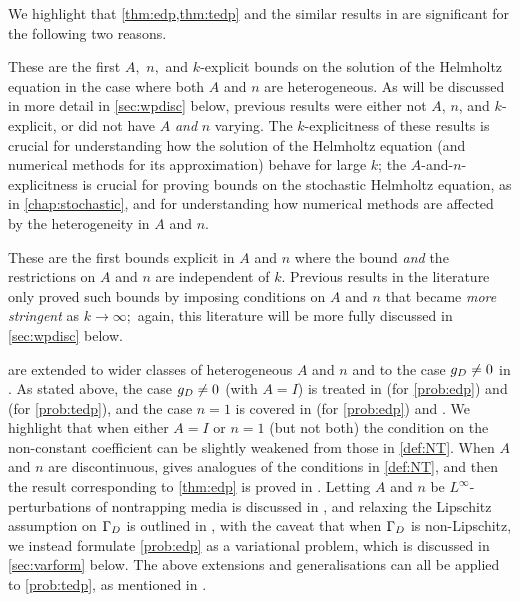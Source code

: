 We highlight that \cref{thm:edp,thm:tedp} and the similar results in \cite{GrPeSp:19} are significant for the following two reasons.
\ben
\item These are the first $A,$ $n,$ and $k$-explicit bounds on the solution of the Helmholtz equation in the case where both $A$ and $n$ are heterogeneous. As will be discussed in more detail in \cref{sec:wpdisc} below, previous results were either not $A$, $n$, and $k$-explicit, or did not have $A$ \emph{and} $n$ varying. The $k$-explicitness of these results is crucial for understanding how the solution of the Helmholtz equation (and numerical methods for its approximation) behave for large $k$; the $A$-and-$n$-explicitness is crucial for proving bounds on the stochastic Helmholtz equation, as in \cref{chap:stochastic}, and for understanding how numerical methods are affected by the heterogeneity in $A$ and $n.$
  \item These are the first bounds explicit in $A$ and $n$ where the bound \emph{and} the restrictions on $A$ and $n$ are independent of $k.$ Previous results in the literature only proved such bounds by imposing conditions on $A$ and $n$ that became \emph{more stringent} as $k \rightarrow \infty;$ again, this literature will be more fully discussed in \cref{sec:wpdisc} below.
\een

\label{rem:heteroextensions}
 are extended to wider classes of heterogeneous $A$ and $n$ and to the case $g_{D} \neq 0$ in \cite{GrPeSp:19}. As stated above, the case $g_{D} \neq 0$ (with $A=I$) is treated in \cite[Theorem 2.19(ii)]{GrPeSp:19} (for \cref{prob:edp}) and \cite[Theorem A.6(iv)]{GrPeSp:19} (for \cref{prob:tedp}), and the case $n=1$ is covered in \cite[Theorem 2.19(i)]{GrPeSp:19} (for \cref{prob:edp}) and \cite[Theorem A.6(ii)]{GrPeSp:19}. We highlight that when either $A=I$ or $n=1$ (but not both) the condition on the non-constant coefficient can be slightly weakened from those in \cref{def:NT}. When $A$ and $n$ are discontinuous, \cite[Condition 2.6]{GrPeSp:19} gives analogues of the conditions in \cref{def:NT}, and then the result corresponding to \cref{thm:edp} is proved in \cite[Theorem 2.7]{GrPeSp:19}. Letting $A$ and $n$ be $L^\infty$-perturbations of nontrapping media is discussed in \cite[Remark 2.15]{GrPeSp:19}, and relaxing the Lipschitz assumption on $\Gamma_{D}$ is outlined in \cite[Remark 2.13]{GrPeSp:19}, with the caveat that when $\Gamma_{D}$ is non-Lipschitz, we instead formulate \cref{prob:edp} as a variational problem, which is discussed in \cref{sec:varform} below. The above extensions and generalisations can all be applied to \cref{prob:tedp}, as mentioned in \cite[p. 2916]{GrPeSp:19}.
\ere
